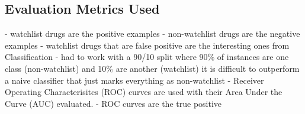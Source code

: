 \documentclass[twoside,11pt]{article}
\begin{document}
\subsection{Evaluation Metrics Used}
- watchlist drugs are the positive examples
- non-watchlist drugs are the negative examples
- watchlist drugs that are false positive are the interesting ones from Classification
- had to work with a 90/10 split where 90\% of instances are one class (non-watchlist) and 10\% are another
(watchlist) it is difficult to outperform a naive classifier that just marks everything as non-watchlist
- Receiver Operating Characterisitcs (ROC) curves are used with their Area Under the Curve (AUC)
evaluated.
- ROC curves are the true positive











\vskip 0.2in

\end{document}
